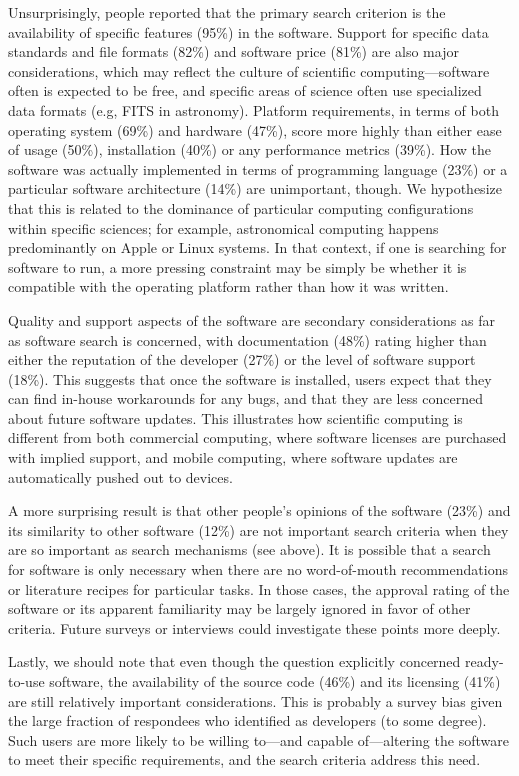 \documentclass{casicswhitepaper}
\begin{document}
Unsurprisingly, people reported that the primary search criterion is the availability of specific features (95\%) in the software. Support for specific data standards and file formats (82\%) and software price (81\%) are also major considerations, which may reflect the culture of scientific computing---software often is expected to be free, and specific areas of science often use specialized data formats (e.g, FITS in astronomy). Platform requirements, in terms of both operating system (69\%) and hardware (47\%), score more highly than either ease of usage (50\%), installation (40\%) or any performance metrics (39\%). How the software was actually implemented in terms of programming language (23\%) or a particular software architecture (14\%) are unimportant, though.  We hypothesize that this is related to the dominance of particular computing configurations within specific sciences; for example, astronomical computing happens predominantly on Apple or Linux systems.  In that context, if one is searching for software to run, a more pressing constraint may be simply be whether it is compatible with the operating platform rather than how it was written.

Quality and support aspects of the software are secondary considerations as far as software search is concerned, with documentation (48\%) rating higher than either the reputation of the developer (27\%) or the level of software support (18\%). This suggests that once the software is installed, users expect that they can find in-house workarounds for any bugs, and that they are less concerned about future software updates. This illustrates how scientific computing is different from both commercial computing, where software licenses are purchased with implied support, and mobile computing, where software updates are automatically pushed out to devices.

A more surprising result is that other people's opinions of the software (23\%) and its similarity to other software (12\%) are not important search criteria when they are so important as search mechanisms (see above). It is possible that a search for software is only necessary when there are no word-of-mouth recommendations or literature recipes for particular tasks. In those cases, the approval rating of the software or its apparent familiarity may be largely ignored in favor of other criteria.  Future surveys or interviews could investigate these points more deeply.

Lastly, we should note that even though the question explicitly concerned ready-to-use software, the availability of the source code (46\%) and its licensing (41\%) are still relatively important considerations. This is probably a survey bias given the large fraction of respondees who identified as developers (to some degree). Such users are more likely to be willing to---and capable of---altering the software to meet their specific requirements, and the search criteria address this need.
\end{document}
